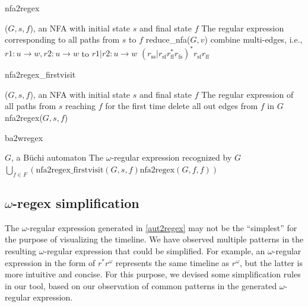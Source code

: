 \documentclass[conference]{IEEEtran}
\theoremstyle{definition}
\theoremstyle{remark}
\newcommand{\Buchi}{B\"{u}chi }
\begin{document}
\begin{algorithm}[h!]
    \caption{nfa2regex}
    \begin{algorithmic}
        \Require ($G, s, f$), an NFA with initial state $s$ and final state $f$
        \Ensure The regular expression corresponding to all paths from $s$ to $f$
            \State reduce\_nfa($G, v$)
            \State combine multi-edges, i.e., $r1 : u \to w, r2 : u \to w$  to $r1 | r2 : u \to w$
        \EndWhile
        \State \Return $(r_\mathrm{ss}| r_\mathrm{sf} r_\mathrm{ff}^* r_\mathrm{fs})^* r_\mathrm{sf} r_\mathrm{ff}$
    \end{algorithmic}
\end{algorithm}

\begin{algorithm}[h!]
    \caption{nfa2regex\_firstvisit}
    \begin{algorithmic}
        \Require ($G, s, f$), an NFA with initial state $s$ and final state $f$
        \Ensure The regular expression of all paths from $s$ reaching $f$ for the first time
        \State delete all out edges from $f$ in $G$
        \State \Return nfa2regex($G, s, f$)
    \end{algorithmic}
\end{algorithm}

\begin{algorithm}[h!]
    \label{alg:ba2wregex}
    \caption{ba2wregex}
    \begin{algorithmic}
        \Require $G$, a \Buchi automaton
        \Ensure The $\omega$-regular expression recognized by $G$
        \State \Return $\bigcup_{f \in F}\left(\text{nfa2regex\_firstvisit}(G, s, f)\text{nfa2regex}(G, f, f) \right) $
    \end{algorithmic}
\end{algorithm}

\subsection{$\omega$-regex simplification} \label{regex-simplify}

The $\omega$-regular expression generated in \cref{aut2regex} may not be the ``simplest'' for the purpose of visualizing the timeline. We have observed multiple patterns in the resulting $\omega$-regular expression that could be simplified. For example, an $\omega$-regular expression in the form of $r^*r^{\omega}$ represents the same timeline as $r^{\omega}$, but the latter is more intuitive and concise. For this purpose, we devised some simplification rules in our tool, based on our observation of common patterns in the generated $\omega$-regular expression.
\end{document}
